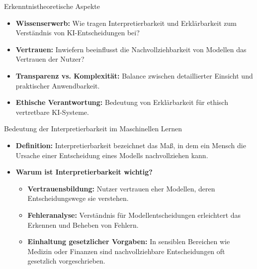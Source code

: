 \documentclass[aspectratio=1610, xcolor=dvipsnames, 9pt]{beamer}
\begin{document}
\begin{frame}{Erkenntnistheoretische Aspekte}
    \begin{itemize}
        \item \textbf{Wissenserwerb:} Wie tragen Interpretierbarkeit und Erklärbarkeit zum Verständnis von KI-Entscheidungen bei? \newline
        \item \textbf{Vertrauen:} Inwiefern beeinflusst die Nachvollziehbarkeit von Modellen das Vertrauen der Nutzer? \newline
        \item \textbf{Transparenz vs. Komplexität:} Balance zwischen detaillierter Einsicht und praktischer Anwendbarkeit. \newline
        \item \textbf{Ethische Verantwortung:} Bedeutung von Erklärbarkeit für ethisch vertretbare KI-Systeme. 
    \end{itemize}
\end{frame}

\begin{frame}{Bedeutung der Interpretierbarkeit im Maschinellen Lernen}
    \begin{itemize}
        \item \textbf{Definition:} \newline
        Interpretierbarkeit bezeichnet das Maß, in dem ein Mensch die Ursache einer Entscheidung eines Modells nachvollziehen kann.
        \newline
        \item \textbf{Warum ist Interpretierbarkeit wichtig?}
        \begin{itemize}
            \item \textbf{Vertrauensbildung:} \newline
            Nutzer vertrauen eher Modellen, deren Entscheidungswege sie verstehen.
            \item \textbf{Fehleranalyse:} \newline
            Verständnis für Modellentscheidungen erleichtert das Erkennen und Beheben von Fehlern.
            \item \textbf{Einhaltung gesetzlicher Vorgaben:} \newline
            In sensiblen Bereichen wie Medizin oder Finanzen sind nachvollziehbare Entscheidungen oft gesetzlich vorgeschrieben.
        \end{itemize}
    \end{itemize}
\end{frame}
\end{document}
